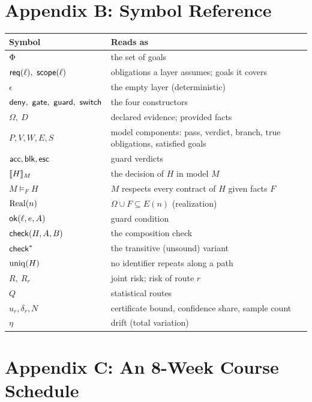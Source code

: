 \section*{Appendix B: Symbol Reference}

\begin{center}
\renewcommand{\arraystretch}{1.2}
\small
\begin{tabularx}{\textwidth}{@{}lX@{}}
\toprule
\textbf{Symbol} & \textbf{Reads as}\\
\midrule
$\Phi$ & the set of goals\\
$\req(\ell),\ \scope(\ell)$ & obligations a layer assumes; goals it covers\\
$\epsilon$ & the empty layer (deterministic)\\
$\deny,\ \gate,\ \guard,\ \switch$ & the four constructors\\
$\Omega,\ D$ & declared evidence; provided facts\\
$P,V,W,E,S$ & model components: pass, verdict, branch, true obligations, satisfied goals\\
$\mathsf{acc},\mathsf{blk},\mathsf{esc}$ & guard verdicts\\
$\llbracket H\rrbracket_{M}$ & the decision of $H$ in model $M$\\
$M\models_FH$ & $M$ respects every contract of $H$ given facts $F$\\
$\mathrm{Real}(n)$ & $\Omega\cup F\subseteq E(n)$ (realization)\\
$\mathsf{ok}(\ell,e,A)$ & guard condition\\
$\mathsf{check}(H,A,B)$ & the composition check\\
$\mathsf{check}^{*}$ & the transitive (unsound) variant\\
$\mathrm{uniq}(H)$ & no identifier repeats along a path\\
$R,\ R_r$ & joint risk; risk of route $r$\\
$Q$ & statistical routes\\
$u_r,\delta_r,N$ & certificate bound, confidence share, sample count\\
$\eta$ & drift (total variation)\\
\bottomrule
\end{tabularx}
\end{center}

\section*{Appendix C: An 8-Week Course Schedule}
\label{app:schedule}

